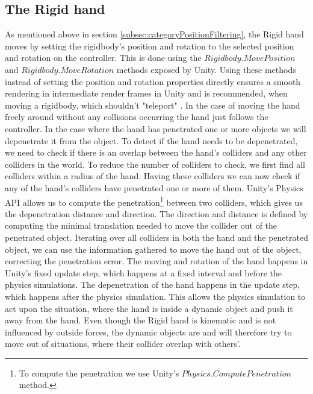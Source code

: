 \subsection{The Rigid hand}
\label{subsec:rigidHand}
As mentioned above in section \ref{subsec:categoryPositionFiltering}, the Rigid hand moves by setting the rigidbody's position and rotation to the selected position and rotation on the controller. This is done using the $Rigidbody.MovePosition$ and $Rigidbody.MoveRotation$ methods exposed by Unity. Using these methods instead of setting the position and rotation properties directly ensures a smooth rendering in intermediate render frames in Unity and is recommended, when moving a rigidbody, which shouldn't "teleport" \parencite{UnityMovePosition2017}. In the case of moving the hand freely around without any collisions occurring the hand just follows the controller. In the case where the hand has penetrated one or more objects we will depenetrate it from the object. To detect if the hand needs to be depenetrated, we need to check if there is an overlap between the hand's colliders and any other colliders in the world. To reduce the number of colliders to check, we first find all colliders within a radius of the hand. Having these colliders we can now check if any of the hand's colliders have penetrated one or more of them. Unity's Physics API allows us to compute the penetration\footnote{To compute the penetration we use Unity's $Physics.ComputePenetration$ method.} between two colliders, which gives us the depenetration distance and direction. The direction and distance is defined by computing the minimal translation needed to move the collider out of the penetrated object. Iterating over all colliders in both the hand and the penetrated object, we can use the information gathered to move the hand out of the object, correcting the penetration error. The moving and rotation of the hand happens in Unity's fixed update step, which happens at a fixed interval and before the physics simulations. The depenetration of the hand happens in the update step, which happens after the physics simulation. This allows the physics simulation to act upon the situation, where the hand is inside a dynamic object and push it away from the hand. Even though the Rigid hand is kinematic and is not influenced by outside forces, the dynamic objects are and will therefore try to move out of situations, where their collider overlap with others'.


